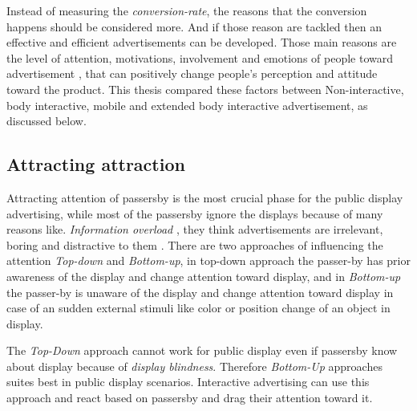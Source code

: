 Instead of measuring the \emph{conversion-rate}, the reasons that the conversion happens should be considered more. And if those reason are tackled then an effective and efficient advertisements can be developed. Those main reasons are the level of attention, motivations, involvement and emotions of people toward advertisement \cite{pervasiv_ad}, that can positively change people’s perception and attitude toward the product. This thesis compared these factors between Non-interactive, body interactive, mobile and extended body interactive advertisement, as discussed below.

\subsection{Attracting attraction}
Attracting attention of passersby is the most crucial phase for the public display advertising, while most of the passersby ignore the displays because of many reasons like. \emph{Information overload} \cite{Information_overload}, they think advertisements are irrelevant, boring and distractive to them \cite{banner_blindness, display_blindness}. There are two approaches of influencing the attention \emph{Top-down} and \emph{Bottom-up}, in top-down approach the passer-by has prior awareness of the display and change attention toward display, and in \emph{Bottom-up} the passer-by is unaware of the display and change attention toward display in case of an sudden external stimuli like color \cite{Luminance} or position \cite{capturingattention} change of an object in display.  

The \emph{Top-Down} approach cannot work for public display even if passersby know about display because of \emph{display blindness}. Therefore \emph{Bottom-Up} approaches suites best in public display scenarios. Interactive advertising can use this approach and react based on passersby and drag their attention toward it.



